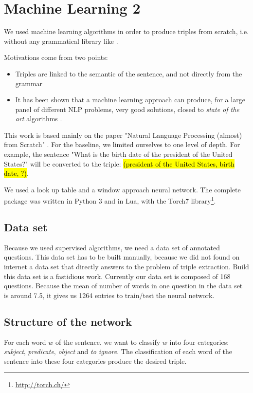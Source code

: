 \section{Machine Learning 2}


We used machine learning algorithms in order to produce triples from scratch, i.e. without any grammatical library like \Stanford.

Motivations come from two points:
\begin{itemize}
\item Triples are linked to the semantic of the sentence, and not directly from the grammar
\item It has been shown that a machine learning approach can produce, for a large panel of different NLP problems, very good solutions, closed to \textit{state of the art} algorithms \cite{collobert}.
\end{itemize}

This work is based mainly on the paper "Natural Language Processing (almost) from Scratch" \cite{collobert}.
For the baseline, we limited ourselves to one level of depth.
For example, the sentence "What is the birth date of the president of the United States?" will be converted to the triple: 
\hl{(president of the United States, birth date, ?)}. 

We used a look up table and a window approach neural network. The complete package was written in Python 3 and in Lua, with the Torch7 library\footnote{\url{http://torch.ch/}}.

\subsection{Data set}

Because we used supervised algorithms, we need a data set of annotated questions.
This data set has to be built manually, because we did not found on internet a data set that directly answers to the problem of triple extraction.
Build this data set is a fastidious work. Currently our data set is composed of 168 questions.
Because the mean of number of words in one question in the data set is around 7.5, it gives us 1264 entries to train/test the neural network.

\subsection{Structure of the network}

For each word $w$ of the sentence, we want to classify $w$ into four categories: \textit{subject}, \textit{predicate}, \textit{object} and \textit{to ignore}.
The classification of each word of the sentence into these four categories produce the desired triple.

